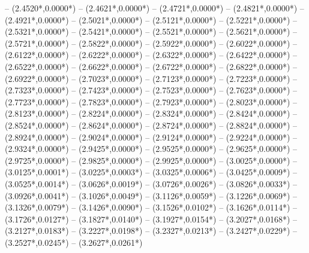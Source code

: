 {	-- ({2.4520*\dx},{0.0000*\dy})
	-- ({2.4621*\dx},{0.0000*\dy})
	-- ({2.4721*\dx},{0.0000*\dy})
	-- ({2.4821*\dx},{0.0000*\dy})
	-- ({2.4921*\dx},{0.0000*\dy})
	-- ({2.5021*\dx},{0.0000*\dy})
	-- ({2.5121*\dx},{0.0000*\dy})
	-- ({2.5221*\dx},{0.0000*\dy})
	-- ({2.5321*\dx},{0.0000*\dy})
	-- ({2.5421*\dx},{0.0000*\dy})
	-- ({2.5521*\dx},{0.0000*\dy})
	-- ({2.5621*\dx},{0.0000*\dy})
	-- ({2.5721*\dx},{0.0000*\dy})
	-- ({2.5822*\dx},{0.0000*\dy})
	-- ({2.5922*\dx},{0.0000*\dy})
	-- ({2.6022*\dx},{0.0000*\dy})
	-- ({2.6122*\dx},{0.0000*\dy})
	-- ({2.6222*\dx},{0.0000*\dy})
	-- ({2.6322*\dx},{0.0000*\dy})
	-- ({2.6422*\dx},{0.0000*\dy})
	-- ({2.6522*\dx},{0.0000*\dy})
	-- ({2.6622*\dx},{0.0000*\dy})
	-- ({2.6722*\dx},{0.0000*\dy})
	-- ({2.6822*\dx},{0.0000*\dy})
	-- ({2.6922*\dx},{0.0000*\dy})
	-- ({2.7023*\dx},{0.0000*\dy})
	-- ({2.7123*\dx},{0.0000*\dy})
	-- ({2.7223*\dx},{0.0000*\dy})
	-- ({2.7323*\dx},{0.0000*\dy})
	-- ({2.7423*\dx},{0.0000*\dy})
	-- ({2.7523*\dx},{0.0000*\dy})
	-- ({2.7623*\dx},{0.0000*\dy})
	-- ({2.7723*\dx},{0.0000*\dy})
	-- ({2.7823*\dx},{0.0000*\dy})
	-- ({2.7923*\dx},{0.0000*\dy})
	-- ({2.8023*\dx},{0.0000*\dy})
	-- ({2.8123*\dx},{0.0000*\dy})
	-- ({2.8224*\dx},{0.0000*\dy})
	-- ({2.8324*\dx},{0.0000*\dy})
	-- ({2.8424*\dx},{0.0000*\dy})
	-- ({2.8524*\dx},{0.0000*\dy})
	-- ({2.8624*\dx},{0.0000*\dy})
	-- ({2.8724*\dx},{0.0000*\dy})
	-- ({2.8824*\dx},{0.0000*\dy})
	-- ({2.8924*\dx},{0.0000*\dy})
	-- ({2.9024*\dx},{0.0000*\dy})
	-- ({2.9124*\dx},{0.0000*\dy})
	-- ({2.9224*\dx},{0.0000*\dy})
	-- ({2.9324*\dx},{0.0000*\dy})
	-- ({2.9425*\dx},{0.0000*\dy})
	-- ({2.9525*\dx},{0.0000*\dy})
	-- ({2.9625*\dx},{0.0000*\dy})
	-- ({2.9725*\dx},{0.0000*\dy})
	-- ({2.9825*\dx},{0.0000*\dy})
	-- ({2.9925*\dx},{0.0000*\dy})
	-- ({3.0025*\dx},{0.0000*\dy})
	-- ({3.0125*\dx},{0.0001*\dy})
	-- ({3.0225*\dx},{0.0003*\dy})
	-- ({3.0325*\dx},{0.0006*\dy})
	-- ({3.0425*\dx},{0.0009*\dy})
	-- ({3.0525*\dx},{0.0014*\dy})
	-- ({3.0626*\dx},{0.0019*\dy})
	-- ({3.0726*\dx},{0.0026*\dy})
	-- ({3.0826*\dx},{0.0033*\dy})
	-- ({3.0926*\dx},{0.0041*\dy})
	-- ({3.1026*\dx},{0.0049*\dy})
	-- ({3.1126*\dx},{0.0059*\dy})
	-- ({3.1226*\dx},{0.0069*\dy})
	-- ({3.1326*\dx},{0.0079*\dy})
	-- ({3.1426*\dx},{0.0090*\dy})
	-- ({3.1526*\dx},{0.0102*\dy})
	-- ({3.1626*\dx},{0.0114*\dy})
	-- ({3.1726*\dx},{0.0127*\dy})
	-- ({3.1827*\dx},{0.0140*\dy})
	-- ({3.1927*\dx},{0.0154*\dy})
	-- ({3.2027*\dx},{0.0168*\dy})
	-- ({3.2127*\dx},{0.0183*\dy})
	-- ({3.2227*\dx},{0.0198*\dy})
	-- ({3.2327*\dx},{0.0213*\dy})
	-- ({3.2427*\dx},{0.0229*\dy})
	-- ({3.2527*\dx},{0.0245*\dy})
	-- ({3.2627*\dx},{0.0261*\dy})
}
